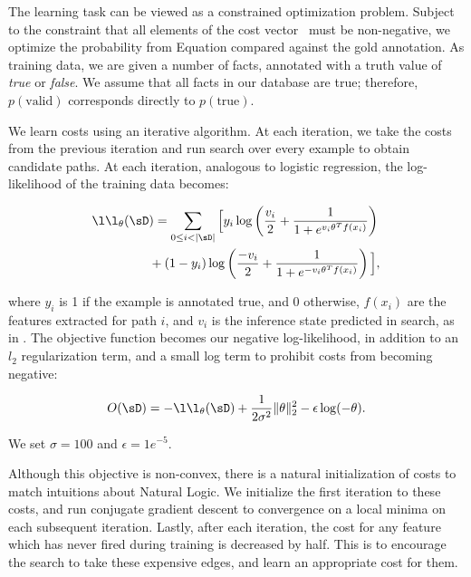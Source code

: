 The learning task can be viewed as a constrained optimization problem.
Subject to the constraint that all elements of the cost vector \btheta\ 
  must be non-negative, we optimize the probability from
  Equation  compared against the gold annotation.
As training data, we are given a number of facts, annotated with a
  truth value of \textit{true} or \textit{false}.
We assume that all facts in our database are true; therefore,
  $p(\textrm{valid})$ corresponds directly to $p(\textrm{true})$.

We learn costs using an iterative algorithm.
At each iteration, we take the costs from the previous iteration
  and run search over every example to obtain candidate paths.
At each iteration, analogous to logistic regression,
  the log-likelihood of the training data becomes:

\begin{align*}
\l\l_\theta(\sD&) = \sum_{0 \leq i < |\sD|} \Big[
    y_i \log \left(\frac{v_i}{2} + \frac{1}{1 + e^{v_i \theta^{T} f(x_i)}} \right) \\
    &+ (1 - y_i) \log \left(\frac{-v_i}{2} + \frac{1}{1 + e^{-v_i \theta^{T} f(x_i)}} \right)
  \Big],
\end{align*}

\noindent where $y_i$ is 1 if the example is annotated true, and 0
  otherwise, $f(x_i)$ are the features extracted for path $i$, and
  $v_i$ is the inference state predicted in search, as in
  .
The objective function becomes our negative log-likelihood, in addition
  to an $l_2$ regularization term, and a small log term to prohibit
  costs from becoming negative:

\begin{equation*}
O(\sD) = -\l\l_\theta(\sD) 
  + \frac{1}{2 \sigma^2}\|\theta\|_2^2
  - \epsilon \log(-\theta).
\end{equation*}

\noindent We set $\sigma=100$ and $\epsilon=1e^{-5}$.

Although this objective is non-convex, there is a natural initialization
  of costs to match intuitions about Natural Logic.
We initialize the first iteration to these costs, and run
  conjugate gradient descent to convergence on a local minima
  on each subsequent iteration.
Lastly, after each iteration, the cost for any feature which has
  never fired during training is decreased by half.
This is to encourage the search to take these expensive edges, and
  learn an appropriate cost for them.



